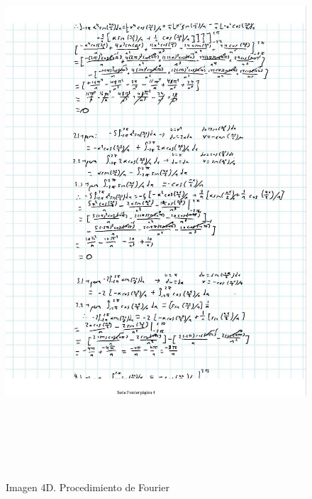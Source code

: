 \begin{figure}[H]
	\centering
	\includegraphics[width=6.26772in,height=8.11111in]{media/image57.jpg}
	\caption{Imagen 4D. Procedimiento de Fourier}
\end{figure}

